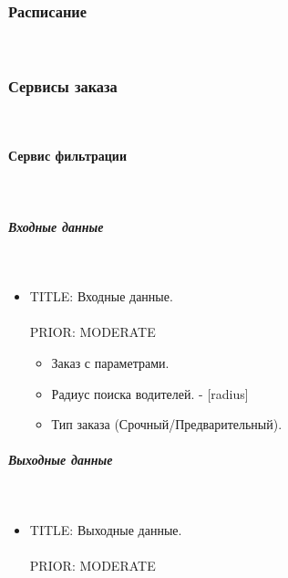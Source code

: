   \subsubsection{Расписание} \mbox{} \\ \label{}

  \subsubsection{Сервисы заказа} \mbox{} \\ \label{}

    \paragraph{Сервис фильтрации} \mbox{} \\ \label{driver_filters_taxi_service}

        \subparagraph{Входные данные} \mbox{} \\ \label{driver_filters_taxi_service_input_data}

          \begin{itemize}

            \item{

              TITLE: Входные данные.\\
              \\
              PRIOR: MODERATE\\

            }

            \begin{itemize}
              \item Заказ с параметрами.
              \item Радиус поиска водителей. - [radius]
              \item Тип заказа (Срочный/Предварительный).
            \end{itemize}

          \end{itemize}

        \subparagraph{Выходные данные} \mbox{} \\

          \begin{itemize}

            \item{

              TITLE: Выходные данные.\\
              \\
              PRIOR: MODERATE\\

            }

          \end{itemize}

